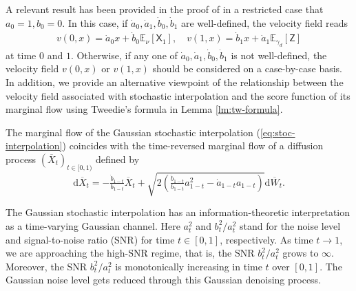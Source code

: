 \documentclass[twoside,11pt]{article}
\newcommand{\E}{\mathbb{E}}
\def\paref#1{(\ref{#1})}
\newcommand{\diff}{\mathrm{d}}
\numberwithin{equation}{section}
\begin{document}
\begin{remark}
A relevant result has been provided in the proof of \cite[Proposition 4]{albergo2023building} in a restricted case that $a_0 = 1, b_0 = 0$.
In this case, if $\dot{a}_0, \dot{a}_1, \dot{b}_0, \dot{b}_1$ are well-defined, the velocity field reads
\begin{align*}
    v(0, x) = \dot{a}_0 x + \dot{b}_0 \E_{\nu} [\mathsf{X}_1], \quad
    v(1, x) = \dot{b}_1 x + \dot{a}_1 \E_{\gamma_d} [\mathsf{Z}]
\end{align*}
at time $0$ and $1$.
Otherwise, if any one of $\dot{a}_0, \dot{a}_1, \dot{b}_0, \dot{b}_1$ is not well-defined, the velocity field $v(0, x)$ or $v(1, x)$ should be considered on a case-by-case basis.
In addition, we provide an alternative viewpoint of the relationship between the velocity field associated with stochastic interpolation and the score function of its marginal flow
using Tweedie's formula in Lemma \ref{lm:tw-formula}.
\end{remark}


\begin{remark} 
The marginal flow of the Gaussian stochastic interpolation \paref{eq:stoc-interpolation} coincides with the time-reversed marginal flow of a diffusion process $(\overline{X}_t)_{t \in [0, 1)}$ \cite[Theorem 3.5]{albergo2023stochastic} defined by
\begin{equation*}
    \diff \overline{X}_t = -\tfrac{\dot{b}_{1-t}}{b_{1-t}} \overline{X}_t + \sqrt{2 \left( \tfrac{\dot{b}_{1-t}}{b_{1-t}} a_{1-t}^2 - \dot{a}_{1-t} a_{1-t} \right)}\diff \overline{W}_t.
\end{equation*}
\end{remark}

\begin{remark}  \label{rm:gauss-channel}
    The Gaussian stochastic interpolation has an information-theoretic interpretation as a time-varying Gaussian channel. Here $a_t^2$ and $b_t^2 / a_t^2$ stand for the noise level and signal-to-noise ratio (SNR) for time $t \in [0, 1]$, respectively. As time $t \to 1$, we are approaching the high-SNR regime, that is, the SNR $b_t^2 / a_t^2$ grows to $\infty$. Moreover, the SNR $b_t^2 / a_t^2$ is monotonically increasing in time $t$ over $[0, 1]$. The Gaussian noise level gets reduced through this Gaussian denoising process.
\end{remark}
\end{document}
